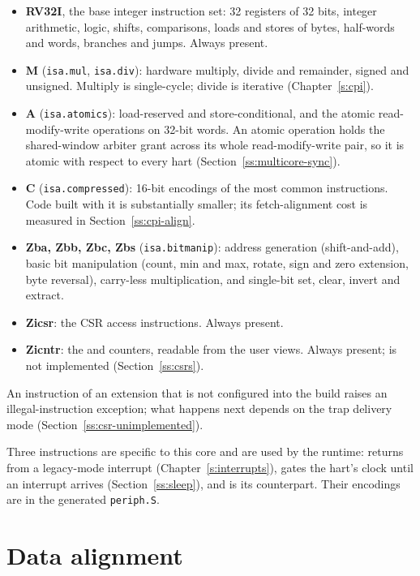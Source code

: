 \documentclass[11pt,pdftex,openany,letterpaper]{report}
\begin{document}
\begin{itemize}[itemsep=1pt]
	\item \textbf{RV32I}, the base integer instruction set: 32 registers of 32 bits, integer arithmetic, logic, shifts, comparisons, loads and stores of bytes, half-words and words, branches and jumps. Always present.
	\item \textbf{M} (\texttt{isa.mul}, \texttt{isa.div}): hardware multiply, divide and remainder, signed and unsigned. Multiply is single-cycle; divide is iterative (Chapter~\ref{s:cpi}).
	\item \textbf{A} (\texttt{isa.atomics}): load-reserved and store-conditional, and the atomic read-modify-write operations on 32-bit words. An atomic operation holds the shared-window arbiter grant across its whole read-modify-write pair, so it is atomic with respect to every hart (Section~\ref{ss:multicore-sync}).
	\item \textbf{C} (\texttt{isa.compressed}): 16-bit encodings of the most common instructions. Code built with it is substantially smaller; its fetch-alignment cost is measured in Section~\ref{ss:cpi-align}.
	\item \textbf{Zba, Zbb, Zbc, Zbs} (\texttt{isa.bitmanip}): address generation (shift-and-add), basic bit manipulation (count, min and max, rotate, sign and zero extension, byte reversal), carry-less multiplication, and single-bit set, clear, invert and extract.
	\item \textbf{Zicsr}: the CSR access instructions. Always present.
	\item \textbf{Zicntr}: the  and  counters, readable from the user views. Always present;  is not implemented (Section~\ref{ss:csrs}).
\end{itemize}

An instruction of an extension that is not configured into the build raises an illegal-instruction exception; what happens next depends on the trap delivery mode (Section~\ref{ss:csr-unimplemented}).

Three instructions are specific to this core and are used by the runtime:  returns from a legacy-mode interrupt (Chapter~\ref{s:interrupts}),  gates the hart's clock until an interrupt arrives (Section~\ref{ss:sleep}), and  is its counterpart. Their encodings are in the generated \texttt{periph.S}.

\section{Data alignment} \label{ss:alignment}
\end{document}
